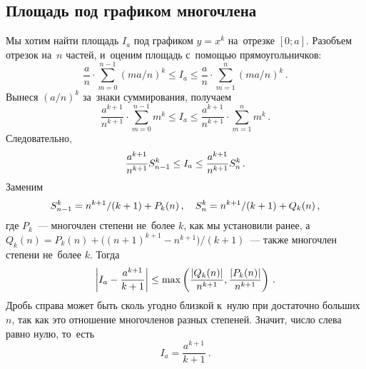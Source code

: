 \subsection*{Площадь под графиком многочлена}

Мы хотим найти площадь $I_{a}$ под графиком $y = x^{k}$ на~отрезке $[0; a]$.
Разобъем отрезок на~$n$ частей, и~оценим площадь с~помощью прямоугольничков:
\[
    \frac{a}{n}
    \cdot
    \sum_{m=0}^{n-1}
        (m a / n)^{k}
\leq
    I_{a}
\leq
    \frac{a}{n}
    \cdot
    \sum_{m=1}^{n}
        (m a / n)^{k}
\, . \]
Вынеся $(a / n)^{k}$ за~знаки суммирования, получаем
\[
    \frac{a^{k+1}}{n^{k+1}}
    \cdot
    \sum_{m=0}^{n-1}
        m^{k}
\leq
    I_{a}
\leq
    \frac{a^{k+1}}{n^{k+1}}
    \cdot
    \sum_{m=1}^{n}
        m^{k}
\, . \]
Следовательно,
\[
    \frac{a^{k+1}}{n^{k+1}}
    S^{k}_{n-1}
\leq
    I_{a}
\leq
    \frac{a^{k+1}}{n^{k+1}}
    S^{k}_{n}
\, . \]
Заменим
\[
    S^{k}_{n-1} = n^{k+1} / (k + 1) + P_{k}(n)
\, , \quad
    S^{k}_{n} = n^{k+1} / (k + 1) + Q_{k}(n)
\, ,\]
где $P_{k}$~--- многочлен степени не~более $k$, как мы установили ранее,
а~$Q_{k}(n) = P_{k}(n) + \bigl( (n + 1)^{k+1} - n^{k+1} \bigr) / (k + 1)$~---
также многочлен степени не~более $k$.
Тогда
\[
    \left \lvert I_{a} - \frac{a^{k+1}}{k + 1} \right \rvert
\leq
    \max\left(
        \frac{\lvert Q_{k}(n) \rvert}{n^{k+1}}
    ,
        \frac{\lvert P_{k}(n) \rvert}{n^{k+1}}
    \right)
\, . \]
Дробь справа может быть сколь угодно близкой к~нулю при достаточно больших $n$,
так как это отношение многочленов разных степеней.
Значит, число слева равно нулю, то~есть
\[
    I_{a} = \frac{a^{k+1}}{k + 1}
\ . \]

\endgroup %

